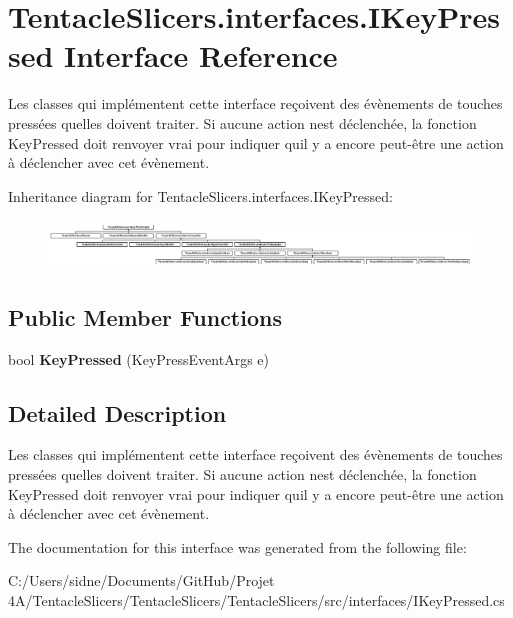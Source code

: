 \hypertarget{interface_tentacle_slicers_1_1interfaces_1_1_i_key_pressed}{}\section{Tentacle\+Slicers.\+interfaces.\+I\+Key\+Pressed Interface Reference}
\label{interface_tentacle_slicers_1_1interfaces_1_1_i_key_pressed}


Les classes qui implémentent cette interface reçoivent des évènements de touches pressées qu\textquotesingle{}elles doivent traiter. Si aucune action n\textquotesingle{}est déclenchée, la fonction Key\+Pressed doit renvoyer vrai pour indiquer qu\textquotesingle{}il y a encore peut-\/être une action à déclencher avec cet évènement.  


Inheritance diagram for Tentacle\+Slicers.\+interfaces.\+I\+Key\+Pressed\+:\begin{figure}[H]
\begin{center}
\leavevmode
\includegraphics[height=1.282051cm]{interface_tentacle_slicers_1_1interfaces_1_1_i_key_pressed}
\end{center}
\end{figure}
\subsection*{Public Member Functions}
\begin{DoxyCompactItemize}
\item 
\mbox{\label{interface_tentacle_slicers_1_1interfaces_1_1_i_key_pressed_a408f18cdde6a16851aace6ec08903c81}} 
bool {\bfseries Key\+Pressed} (Key\+Press\+Event\+Args e)
\end{DoxyCompactItemize}


\subsection{Detailed Description}
Les classes qui implémentent cette interface reçoivent des évènements de touches pressées qu\textquotesingle{}elles doivent traiter. Si aucune action n\textquotesingle{}est déclenchée, la fonction Key\+Pressed doit renvoyer vrai pour indiquer qu\textquotesingle{}il y a encore peut-\/être une action à déclencher avec cet évènement. 



The documentation for this interface was generated from the following file\+:\begin{DoxyCompactItemize}
\item 
C\+:/\+Users/sidne/\+Documents/\+Git\+Hub/\+Projet 4\+A/\+Tentacle\+Slicers/\+Tentacle\+Slicers/\+Tentacle\+Slicers/src/interfaces/I\+Key\+Pressed.\+cs\end{DoxyCompactItemize}
